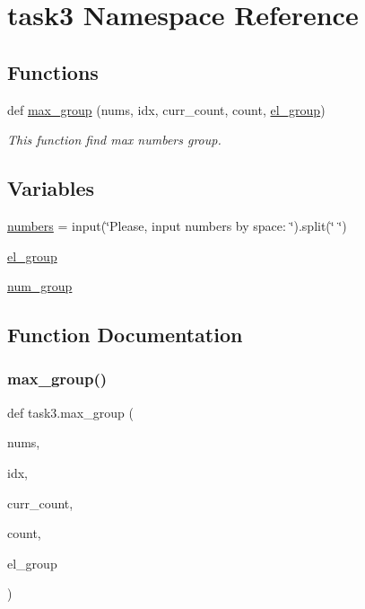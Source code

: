 \hypertarget{namespacetask3}{}\section{task3 Namespace Reference}
\label{namespacetask3}
\subsection*{Functions}
\begin{DoxyCompactItemize}
\item 
def \hyperlink{namespacetask3_a9f8efe5e884ae9740f6d54dc1b47318e}{max\+\_\+group} (nums, idx, curr\+\_\+count, count, \hyperlink{namespacetask3_aca36b94346734b44ac66878696ca6d68}{el\+\_\+group})
\begin{DoxyCompactList}\small\item\em This function find max numbers group. \end{DoxyCompactList}\end{DoxyCompactItemize}
\subsection*{Variables}
\begin{DoxyCompactItemize}
\item 
\hyperlink{namespacetask3_a82430726637394847e6f3f9c07320a4e}{numbers} = input(\char`\"{}Please, input numbers by space\+: \char`\"{}).split(\char`\"{} \char`\"{})
\item 
\hyperlink{namespacetask3_aca36b94346734b44ac66878696ca6d68}{el\+\_\+group}
\item 
\hyperlink{namespacetask3_afd4ae17f75b492f6bd6db04bd6ca703c}{num\+\_\+group}
\end{DoxyCompactItemize}


\subsection{Function Documentation}
\mbox{\label{namespacetask3_a9f8efe5e884ae9740f6d54dc1b47318e}} 
\subsubsection{\texorpdfstring{max\+\_\+group()}{max\_group()}}
{\footnotesize\ttfamily def task3.\+max\+\_\+group (\begin{DoxyParamCaption}\item[{}]{nums,  }\item[{}]{idx,  }\item[{}]{curr\+\_\+count,  }\item[{}]{count,  }\item[{}]{el\+\_\+group }\end{DoxyParamCaption})}



